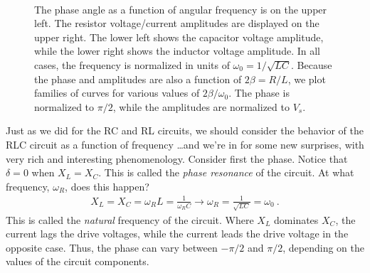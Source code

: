 \documentclass[12pt]{article}
\begin{document}
\begin{figure}
  \centering
  \\
  \caption{The phase angle as a function of angular frequency is on
    the upper left.  The resistor voltage/current amplitudes are
    displayed on the upper right.  The lower left shows the capacitor
    voltage amplitude, while the lower right shows the inductor
    voltage amplitude.  In all cases, the frequency is normalized in
    units of $\omega_0 = 1/\sqrt{LC}$.  Because the phase and
    amplitudes are also a function of $2\beta = R/L$, we plot families
    of curves for various values of $2\beta/\omega_0$.  The phase is
    normalized to $\pi/2$, while the amplitudes are normalized to
    $V_s$.}
  \label{fig:frequency}
\end{figure}
Just as we did for the RC and RL circuits, we should consider the
behavior of the RLC circuit as a function of frequency \ldots and
we're in for some new surprises, with very rich and interesting
phenomenology. Consider first the phase.  Notice that $\delta=0$ when
$X_L = X_C$.  This is called the \textit{phase resonance} of the
circuit.  At what frequency, $\omega_R$, does this happen?
\begin{gather*}
  X_L = X_C = \omega_R L = \frac{1}{\omega_R C} \longrightarrow
  \omega_R = \frac{1}{\sqrt{LC}} = \omega_0\ .
\end{gather*}
This is called the \textit{natural} frequency of the circuit.  Where
$X_L$ dominates $X_C$, the current lags the drive voltages, while the
current leads the drive voltage in the opposite case.  Thus, the phase
can vary between $-\pi/2$ and $\pi/2$, depending on the values of the
circuit components.
\end{document}
